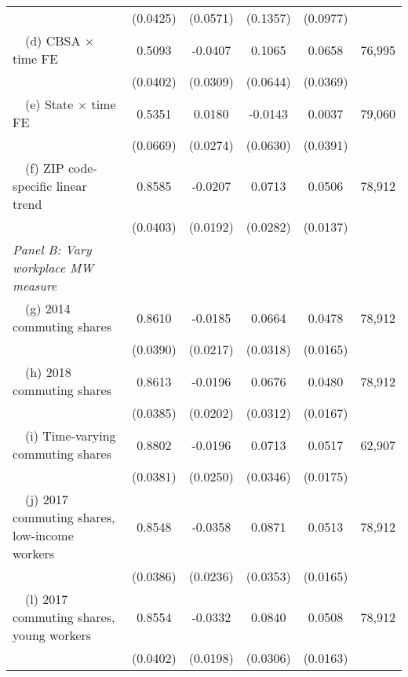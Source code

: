 \begin{landscape}
\begin{table}[ht!]
\begin{tabular}{@{}lccccc@{}}
                                                             & (0.0425) & (0.0571) & (0.1357) & (0.0977) &      \\
        $\quad$(d) CBSA $\times$ time FE                     &  0.5093  &  -0.0407  &  0.1065  &  0.0658  & 76,995 \\
                                                             & (0.0402) & (0.0309) & (0.0644) & (0.0369) &      \\
        $\quad$(e) State $\times$ time FE                    &  0.5351  &  0.0180  &  -0.0143  &  0.0037  & 79,060 \\
                                                             & (0.0669) & (0.0274) & (0.0630) & (0.0391) &      \\
        $\quad$(f) ZIP code-specific linear trend            &  0.8585  &  -0.0207  &  0.0713  &  0.0506  & 78,912 \\
                                                             & (0.0403) & (0.0192) & (0.0282) & (0.0137) &      \\
        \textit{Panel B: Vary workplace MW measure}          &       &       &       &       &      \\
        $\quad$(g) 2014 commuting shares                     &  0.8610  &  -0.0185  &  0.0664  &  0.0478  & 78,912 \\
                                                             & (0.0390) & (0.0217) & (0.0318) & (0.0165) &      \\
        $\quad$(h) 2018 commuting shares                     &  0.8613  &  -0.0196  &  0.0676  &  0.0480  & 78,912 \\
                                                             & (0.0385) & (0.0202) & (0.0312) & (0.0167) &      \\
        $\quad$(i) Time-varying commuting shares             &  0.8802  &  -0.0196  &  0.0713  &  0.0517  & 62,907 \\
                                                             & (0.0381) & (0.0250) & (0.0346) & (0.0175) &      \\
        $\quad$(j) 2017 commuting shares, low-income workers &  0.8548  &  -0.0358  &  0.0871  &  0.0513  & 78,912 \\
                                                             & (0.0386) & (0.0236) & (0.0353) & (0.0165) &      \\
        $\quad$(l) 2017 commuting shares, young workers      &  0.8554  &  -0.0332  &  0.0840  &  0.0508  & 78,912 \\
                                                             & (0.0402) & (0.0198) & (0.0306) & (0.0163) &      \\ \bottomrule
    \end{tabular}


\end{table}
\end{landscape}
